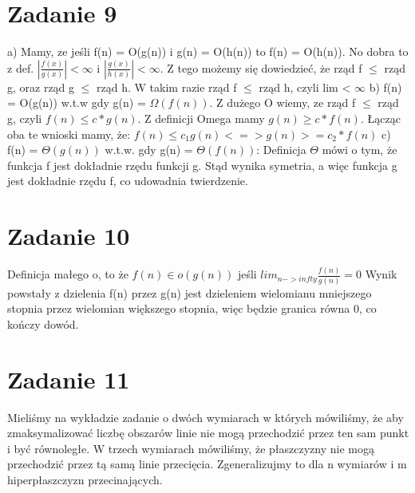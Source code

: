 \documentclass[12pt]{article}
\newcommand{\abs}[1]{\left| #1 \right|}					%
\begin{document}
\section{Zadanie 9}
a) 
Mamy, ze jeśli f(n) = O(g(n)) i g(n) = O(h(n)) to f(n) = O(h(n)).
No dobra to z def. $\abs{\frac{f(x)}{g(x)}} < \infty$ i $\abs{\frac{g(x)}{h(x)}} < \infty$.
Z tego możemy się dowiedzieć, że rząd f $\leq$ rząd g, oraz rząd g $\leq$ rząd h. W takim razie rząd f $\leq$ rząd h, czyli lim < $\infty$
b) 
f(n) = O(g(n)) w.t.w gdy g(n) = $\Omega(f(n))$.
Z dużego O wiemy, ze rząd f $\leq$ rząd g, czyli $f(n) \leq c*g(n)$. Z definicji Omega mamy $g(n) \geq c*f(n)$. Łącząc oba te wnioski mamy, że:
$f(n) \leq c_1 g(n) <=> g(n) >= c_2 * f(n)$
c)
f(n) = $\Theta(g(n))$ w.t.w. gdy g(n) = $\Theta(f(n))$:
Definicja $\Theta$ mówi o tym, że funkcja f jest dokładnie rzędu funkcji g. Stąd wynika symetria, a więc funkcja g jest dokładnie rzędu f, co udowadnia twierdzenie.
\section{Zadanie 10}
Definicja małego o, to że $f(n) \in o(g(n))$ jeśli $lim_{n->infty} \frac{f(n)}{g(n)} = 0$
Wynik powstały z dzielenia f(n) przez g(n) jest dzieleniem wielomianu mniejszego stopnia przez wielomian większego stopnia, więc będzie granica równa 0, co kończy dowód.
\section{Zadanie 11}
Mieliśmy na wykładzie zadanie o dwóch wymiarach w których mówiliśmy, że aby zmaksymalizować liczbę obszarów linie nie mogą przechodzić przez ten sam punkt i być równoległe. W trzech wymiarach mówiliśmy, że płaszczyzny nie mogą przechodzić przez tą samą linie przecięcia. 
Zgeneralizujmy to dla n wymiarów i m hiperpłaszczyzn przecinających. 
\end{document}
